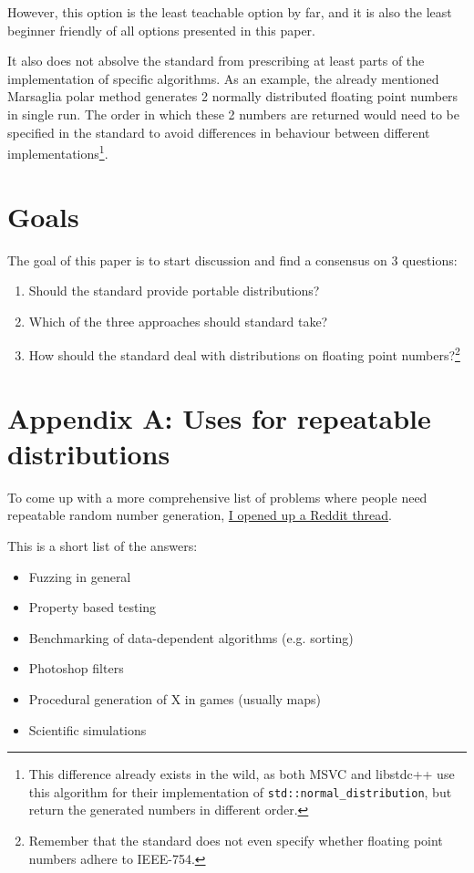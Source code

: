 \documentclass{wg21}
\begin{document}
However, this option is the least teachable option by far, and it is also
the least beginner friendly of all options presented in this paper.

It also does not absolve the standard from prescribing at least parts
of the implementation of specific algorithms. As an example, the already
mentioned Marsaglia polar method generates 2 normally distributed floating
point numbers in single run. The order in which these 2 numbers are returned
would need to be specified in the standard to avoid differences in behaviour
between different implementations\footnote{This difference already exists
in the wild, as both MSVC and libstdc++ use this algorithm for their
implementation of \texttt{std::normal_distribution}, but return
the generated numbers in different order.}.


\hypertarget{goals}{%
    \section{Goals}\label{goals}}

The goal of this paper is to start discussion and find a consensus on 3 questions:

\begin{enumerate}
    \item Should the standard provide portable distributions?
    \item Which of the three approaches should standard take?
    \item How should the standard deal with distributions on floating point numbers?\footnote{Remember that the standard does not even specify whether floating point numbers adhere to IEEE-754.}
\end{enumerate}


\newpage

\appendix

\hypertarget{app-a-uses}{%
    \section{Appendix A: Uses for repeatable distributions}\label{app-a-uses}}

To come up with a more comprehensive list of problems where people need
repeatable random number generation,
\href{https://www.reddit.com/r/cpp/comments/e9mft4/when_did_you_want_to_use_random_but_couldnt/}
{I opened up a Reddit thread}.

This is a short list of the answers:

\begin{itemize}
    \item Fuzzing in general
    \item Property based testing
    \item Benchmarking of data-dependent algorithms (e.g. sorting)
    \item Photoshop filters
    \item Procedural generation of X in games (usually maps)
    \item Scientific simulations
\end{itemize}

%
%
\end{document}
